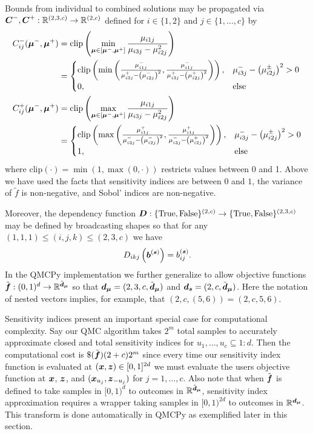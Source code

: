 \documentclass{article}[12pt]
\begin{document}
Bounds from individual to combined solutions may be propagated via $\bC^-,\bC^+:\bbR^{(2, 3, c)} \to \bbR^{(2, c)}$ defined for $i \in \{1,2\}$ and $j \in \{1,\dots,c\}$  by  
\begin{align*}
    C_{ij}^-(\bmu^-,\bmu^+) 
    &= \text{clip}\left(\min_{\bmu \in [\bmu^-,\bmu^+]} \frac{\mu_{i1j}}{\mu_{i3j}-\mu_{i2j}^2}\right) \\
    &= \begin{cases} 
        \text{clip}\left(\min\left(\frac{\mu_{i1j}^-}{\mu_{i3j}^+-\left(\mu_{i2j}^-\right)^2},\frac{\mu_{i1j}^-}{\mu_{i3j}^+-\left(\mu_{i2j}^+\right)^2}\right)\right), & \mu_{i3j}^- - \left(\mu_{i2j}^\pm\right)^2 >0 \\
        0, &\text{else}
    \end{cases} \\
    C_{ij}^+(\bmu^-,\bmu^+) 
    &= \text{clip}\left(\max_{\bmu \in [\bmu^-,\bmu^+]} \frac{\mu_{i1j}}{\mu_{i3j}-\mu_{i2j}^2}\right) \\
    &= \begin{cases} 
        \text{clip}\left(\max\left(\frac{\mu_{i1j}^+}{\mu_{i3j}^--\left(\mu_{i2j}^-\right)^2},\frac{\mu_{i1j}^+}{\mu_{i3j}^--\left(\mu_{i2j}^+\right)^2}\right)\right), & \mu_{i3j}^- - \left(\mu_{i2j}^\pm\right)^2 >0 \\
        1, &\text{else}
    \end{cases}
\end{align*}
where $\text{clip}(\cdot) = \min(1,\max(0,\cdot))$ restricts values between 0 and 1. Above we have used the facts that sensitivity indices are between $0$ and $1$, the variance of $\tilde{f}$ is non-negative, and Sobol' indices are non-negative. 

Moreover, the dependency function $\bD:\tfset^{(2, c)} \to \tfset^{(2, 3, c)}$ may be defined by broadcasting shapes so that for any $(1,1,1) \leq (i,j,k) \leq (2,3,c)$ we have  $$D_{ikj}\left(\bb^{(\bs)}\right) = b_{ij}^{(\bs)}.$$
In the QMCPy implementation we further generalize to allow objective functions $\tilde{\bf}: (0,1)^{d} \to \bbR^{\tilde{\bd}_{\bmu}}$ so that $\bd_{\bmu} = (2,3,c,\tilde{\bd}_{\bmu})$ and $\bd_{\bs} = (2,c,\tilde{\bd}_{\bmu})$. Here the notation of nested vectors implies, for example, that  $(2,c,(5,6)) =(2,c,5,6)$.

Sensitivity indices present an important special case for computational complexity. Say our QMC algorithm takes $2^m$ total samples to accurately approximate closed and total sensitivity indices for $u_1,\dots,u_c \subseteq 1:d$. Then the computational cost is $\$(\tilde{\bf})(2+c)2^m$ since every time our sensitivity index function is evaluated at $(\bx,\bz) \in [0,1]^{2d}$ we must evaluate the users objective function at $\bx$, $\bz$, and $(\bx_{u_j},\bz_{-{u_j}})$ for $j=1,\dots,c$. Also note that when $\tilde{\bf}$ is defined to take samples in  $[0,1)^{d}$ to outcomes in $\bbR^{\tilde{\bd}_{\bmu}}$, sensitivity index approximation requires a wrapper taking samples in $[0,1)^{2d}$ to outcomes in $\bbR^{\bd_{\bmu}}$. This transform is done automatically in QMCPy as exemplified later in this section. 
\end{document}
